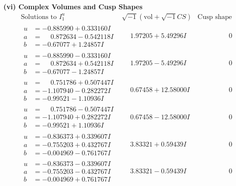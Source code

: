 \documentclass[1p]{elsarticle_modified}
\theoremstyle{definition}
\newcommand{\I}{\sqrt{-1}}
\begin{document}
\newpage\flushleft \textbf{(vi) Complex Volumes and Cusp Shapes}
$$\begin{array}{c|c|c}  
\text{Solutions to }I^u_{1}& \I (\text{vol} + \sqrt{-1}CS) & \text{Cusp shape}\\
 \hline 
\begin{aligned}
u &= -0.885990 + 0.333160 I \\
a &= \phantom{-}0.872634 - 0.542118 I \\
b &= -0.67077 + 1.24857 I\end{aligned}
 & \phantom{-}1.97205 + 5.49296 I & \phantom{-0.000000 } 0 \\ \hline\begin{aligned}
u &= -0.885990 - 0.333160 I \\
a &= \phantom{-}0.872634 + 0.542118 I \\
b &= -0.67077 - 1.24857 I\end{aligned}
 & \phantom{-}1.97205 - 5.49296 I & \phantom{-0.000000 } 0 \\ \hline\begin{aligned}
u &= \phantom{-}0.751786 + 0.507447 I \\
a &= -1.107940 - 0.282272 I \\
b &= -0.99521 - 1.10936 I\end{aligned}
 & \phantom{-}0.67458 + 12.58000 I & \phantom{-0.000000 } 0 \\ \hline\begin{aligned}
u &= \phantom{-}0.751786 - 0.507447 I \\
a &= -1.107940 + 0.282272 I \\
b &= -0.99521 + 1.10936 I\end{aligned}
 & \phantom{-}0.67458 - 12.58000 I & \phantom{-0.000000 } 0 \\ \hline\begin{aligned}
u &= -0.836373 + 0.339607 I \\
a &= -0.755203 + 0.432767 I \\
b &= -0.004969 - 0.761767 I\end{aligned}
 & \phantom{-}3.83321 + 0.59439 I & \phantom{-0.000000 } 0 \\ \hline\begin{aligned}
u &= -0.836373 - 0.339607 I \\
a &= -0.755203 - 0.432767 I \\
b &= -0.004969 + 0.761767 I\end{aligned}
 & \phantom{-}3.83321 - 0.59439 I & \phantom{-0.000000 } 0 \\ \hline\begin{aligned}

\end{aligned}
\end{array}$$
\end{document}

